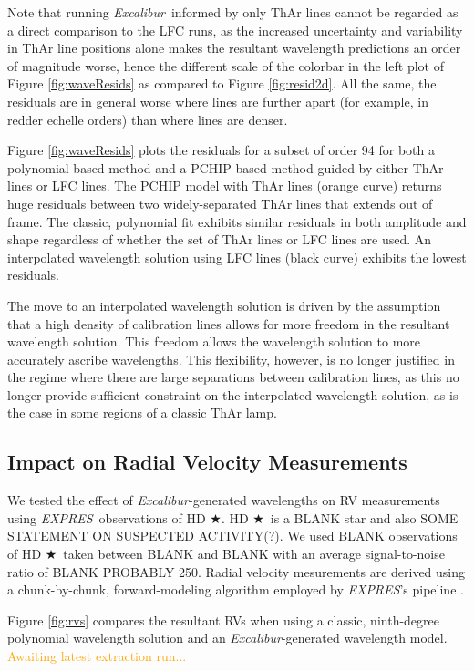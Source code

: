 \documentclass[modern]{aastex63}
\newcommand{\project}[1]{\textsl{#1}}
\newcommand{\name}{\project{Excalibur}}
\newcommand{\acronym}[1]{{\small{#1}}}
\newcommand{\expres}{\project{\acronym{EXPRES}}}
\newcommand{\target}{HD $\bigstar$}
\newcommand{\lz}[1]{\textcolor{orange}{#1}}
\begin{document}
Note that running \name\ informed by only ThAr lines cannot be regarded as a direct comparison to the LFC runs, as the increased uncertainty and variability in ThAr line positions alone makes the resultant wavelength predictions an order of magnitude worse, hence the different scale of the colorbar in the left plot of Figure \ref{fig:waveResids} as compared to Figure \ref{fig:resid2d}.  All the same, the residuals are in general worse where lines are further apart (for example, in redder echelle orders) than where lines are denser.

Figure \ref{fig:waveResids} plots the residuals for a subset of order 94 for both a polynomial-based method and a PCHIP-based method guided by either ThAr lines or LFC lines.   The PCHIP model with ThAr lines (orange curve) returns huge residuals between two widely-separated ThAr lines that extends out of frame.  The classic, polynomial fit exhibits similar residuals in both amplitude and shape regardless of whether the set of ThAr lines or LFC lines are used.  An interpolated wavelength solution using LFC lines (black curve) exhibits the lowest residuals.

The move to an interpolated wavelength solution is driven by the assumption that a high density of calibration lines allows for more freedom in the resultant wavelength solution.  This freedom allows the wavelength solution to more accurately ascribe wavelengths.  This flexibility, however, is no longer justified in the regime where there are large separations between calibration lines, as this no longer provide sufficient constraint on the interpolated wavelength solution, as is the case in some regions of a classic ThAr lamp.

\subsection{Impact on Radial Velocity Measurements}\label{sec:test-rv}
We tested the effect of \name -generated wavelengths on RV measurements using \expres\ observations of \target.  \target\ is a BLANK star and also SOME STATEMENT ON SUSPECTED ACTIVITY(?).  We used BLANK observations of \target\ taken between BLANK and BLANK with an average signal-to-noise ratio of BLANK PROBABLY 250.  Radial velocity mesurements are derived using a chunk-by-chunk, forward-modeling algorithm employed by \expres's pipeline \citep{petersburg2020}.

Figure \ref{fig:rvs} compares the resultant RVs when using a classic, ninth-degree polynomial wavelength solution and an \name -generated wavelength model.
\lz{Awaiting latest extraction run...}
\end{document}
